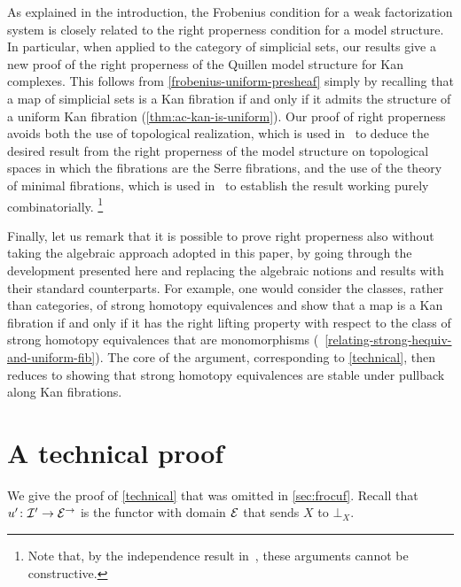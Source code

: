 \documentclass[reqno,10pt,a4paper,oneside,draft]{amsart}
\begin{document}
\begin{remark} \label{rem:rightpropernessnew}
As explained in the introduction, the Frobenius condition for a weak factorization system is closely related to the right properness condition for a model structure.
In particular, when applied to the category of simplicial sets, our results give a new proof of the right properness of the Quillen model structure for Kan complexes.
This follows from \cref{frobenius-uniform-presheaf} simply by recalling that a map of simplicial sets is a Kan fibration if and only if it admits the structure of a uniform Kan fibration (\cref{thm:ac-kan-is-uniform}).
Our proof of right properness avoids both the use of topological realization, which is used in~\cite[Theorem~13.1.13]{hirschhorn-model-localizations} to deduce the desired result from the right properness of the model structure on topological spaces in which the fibrations are the Serre fibrations, and the use of the theory of minimal fibrations, which is used in~\cite[Theorem~1.7.1]{joyal-tierney-notes} to establish the result working purely combinatorially.%
\footnote{Note that, by the independence result in~\cite{coquand-non-constructivity-kan}, these arguments cannot be constructive.}

Finally, let us remark that it is possible to prove right properness also without taking the algebraic approach adopted in this paper, by going through the development presented here and replacing the algebraic notions and results with their standard counterparts.
For example, one would consider the classes, rather than categories, of strong homotopy equivalences and show that a map is a Kan fibration if and only if it has the right lifting property with respect to the class of strong homotopy equivalences that are monomorphisms (\cf~\cref{relating-strong-hequiv-and-uniform-fib}).
The core of the argument, corresponding to \cref{technical}, then reduces to showing that strong homotopy equivalences are stable under pullback along Kan fibrations.
\end{remark}

\appendix

\section{A technical proof}
\label{app:tecp}

We give the proof of \cref{technical} that was omitted in \cref{sec:frocuf}.
Recall that $u' \co \cal{I}' \to \cal{E}^\to$ is the functor with domain $\cal{E}$ that sends $X$ to $\bot_X$.
\end{document}
